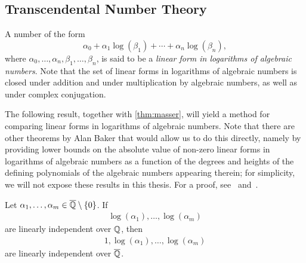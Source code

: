 \subsection{Transcendental Number Theory}


A number of the form
\begin{equation*}
  \alpha_{0} + \alpha_{1} \log(\beta_{1}) + \cdots + \alpha_{n} \log(\beta_{n}),
\end{equation*}
where $\alpha_{0}, \ldots, \alpha_{n}, \beta_{1}, \ldots, \beta_{n}$, is said to be a \emph{linear form in logarithms of algebraic numbers}. Note that the set of linear forms in logarithms of algebraic numbers is closed under addition and under multiplication by algebraic numbers, as well as under complex conjugation.

The following result, together with \cref{thm:masser}, will yield a method for comparing linear forms in logarithms of algebraic numbers. Note that there are other theorems by Alan Baker that would allow us to do this directly, namely by providing lower bounds on the absolute value of non-zero linear forms in logarithms of algebraic numbers as a function of the degrees and heights of the defining polynomials of the algebraic numbers appearing therein; for simplicity, we will not expose these results in this thesis. For a proof, see~\cite{Baker75} and~\cite{BW93}.

\begin{theorem}[Baker]
\label{thm:Baker}
Let $\alpha_{1}, \ldots, \alpha_{m} \in \overline{\mathbb{Q}} \setminus \lbrace 0 \rbrace$. If
\begin{align*}
\log(\alpha_{1}), \ldots, \log(\alpha_{m})
\end{align*}
are linearly independent over $\mathbb{Q}$, then
\begin{align*}
1, \log(\alpha_{1}), \ldots, \log(\alpha_{m})
\end{align*}
are linearly independent over $\overline{\mathbb{Q}}$.
\end{theorem}


